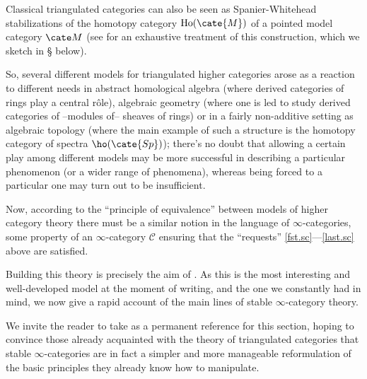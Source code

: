 \documentclass[11pt, a4paper]{amsart}
\renewcommand{\C}{\mathcal{C}}
\begin{document}
Classical triangulated categories can also be seen as Spanier-Whitehead stabilizations of the homotopy category $\text{Ho}(\cate{M})$ of a pointed model category $\cate M$ (see \cite{DeA} for an exhaustive treatment of this construction, which we sketch in \S{} below).

So, several different models for triangulated higher categories arose as a reaction to different needs in abstract homological algebra (where derived categories of rings play a central r\^ole), algebraic geometry (where one is led to study derived categories of --modules of-- sheaves of rings) or in a fairly non-additive setting as algebraic topology (where the main example of such a structure is the homotopy category of spectra $\ho(\cate{Sp})$); there's no doubt that allowing a certain play among different models may be more successful in describing a particular phenomenon (or a wider range of phenomena), whereas being forced to a particular one may turn out to be insufficient.

Now, according to the ``principle of equivalence'' between models of higher category theory there must be a similar notion in the language of $\infty$-categories, \ie some property of an $\infty$-category $\C$ ensuring that the ``requests'' \ref{fst.sc}---\ref{last.sc} above are satisfied.

Building this theory is precisely the aim of \cite[Ch. \textbf{1.1}]{LurieHA}. As this is the most interesting and well-developed model at the moment of writing, and the one we constantly had in mind, we now give a rapid account of the main lines of stable $\infty$-category theory.

We invite the reader to take \cite{LurieHA} as a permanent reference for this section, hoping to convince those already acquainted with the theory of triangulated categories that stable $\infty$-categories are in fact a simpler and more manageable reformulation of the basic principles they already know how to manipulate.
\end{document}
